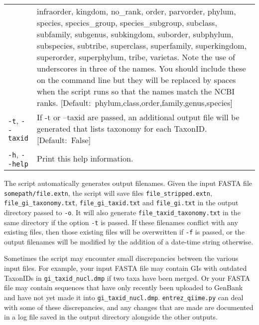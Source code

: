 \documentclass[11pt]{amsart}
\begin{document}
\begin{longtable}{@{} p{1.4in} p{5.35in} @{}} %
      &  \mbox{infraorder}, kingdom, no\_rank, order, parvorder, phylum, species, species\_group, species\_subgroup, subclass, subfamily, subgenus, \mbox{subkingdom}, \mbox{suborder}, \mbox{subphylum}, subspecies, subtribe, superclass, superfamily, \mbox{superkingdom}, \mbox{superorder}, superphylum, tribe, varietas. Note the use of underscores in three of the names. You should include these on the command line but they will be replaced by spaces when the script runs so that the names match the NCBI ranks. \mbox{[Default:~phylum,class,order,family,genus,species]} \\
      \verb|-t|, \verb|--taxid| & If -t or --taxid are passed, an additional output file will be generated that lists taxonomy for each TaxonID.  \mbox{[Default:~False]}	\\
      \verb|-h|, \verb|--help| & Print this help information.
\end{longtable}

The script automatically generates output filenames. Given the input FASTA file \verb|somepath/file.extn|, the script will save files \verb|file_stripped.extn|, \verb|file_gi_taxonomy.txt|, \verb|file_gi_taxid.txt| and \linebreak \verb|file_gi.txt| in the output directory passed to \verb|-o|. It will also generate \verb|file_taxid_taxonomy.txt| in the same directory if the option \verb|-t| is passed. If these filenames conflict with any existing files, then those existing files will be overwritten if \verb|-f| is passed, or the output filenames will be modified by the addition of a date-time string otherwise.

Sometimes the script may encounter small discrepancies between the various input files. For example, your input FASTA file may contain GIs with outdated TaxonIDs in \verb|gi_taxid_nucl.dmp| if two taxa have been merged. Or your FASTA file may contain sequences that have only recently been uploaded to GenBank and have not yet made it into \verb|gi_taxid_nucl.dmp|. \verb|entrez_qiime.py| can deal with some of these discrepancies, and any changes that are made are documented in a log file saved in the output directory alongside the other outputs.

\end{document}
